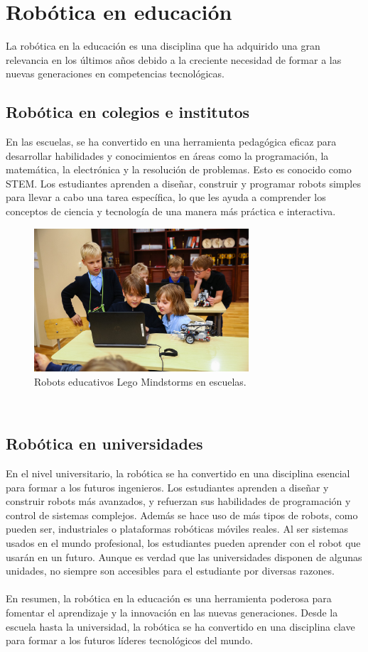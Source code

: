\section{Robótica en educación}
\label{sec:segundaseccion}
La robótica en la educación es una disciplina que ha adquirido una gran relevancia en los últimos años debido a la creciente necesidad 
de formar a las nuevas generaciones en competencias tecnológicas.
\subsection{Robótica en colegios e institutos}
En las escuelas, se ha convertido en una herramienta pedagógica eficaz para desarrollar habilidades y conocimientos en áreas como la programación, 
la matemática, la electrónica y la resolución de problemas. Esto es conocido como \ac{STEM}. Los 
estudiantes aprenden a diseñar, construir y programar robots simples para llevar a cabo una tarea específica, lo que les ayuda a comprender  
los conceptos de ciencia y tecnología de una manera más práctica e interactiva.\\
\begin{figure} [h!]
  \begin{center}
    \includegraphics[width=8cm]{figs/education_robot.jpg}
  \end{center}
  \caption{Robots educativos Lego Mindstorms en escuelas.}
  \label{fig:robSecundaria}
\end{figure}\
\newpage
\subsection{Robótica en universidades}
En el nivel universitario, la robótica se ha convertido en una disciplina esencial para formar a los futuros ingenieros. Los estudiantes aprenden 
a diseñar y construir robots más avanzados, y refuerzan sus habilidades de programación y control de sistemas complejos. Además se hace uso de más tipos 
de robots, como pueden ser, industriales o plataformas robóticas móviles reales. Al ser sistemas usados en el mundo profesional, los estudiantes pueden 
aprender con el robot que usarán en un futuro. Aunque es verdad que las universidades disponen de algunas unidades, no siempre son accesibles para el 
estudiante por diversas razones.
\\\\
En resumen, la robótica en la educación es una herramienta poderosa para fomentar el aprendizaje y la innovación en las nuevas 
generaciones. Desde la escuela hasta la universidad, la robótica se ha convertido en una disciplina clave para formar a los futuros 
líderes tecnológicos del mundo.

